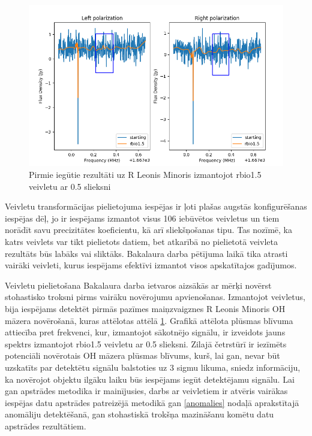 \begin{figure}[h!]

\centering
\includegraphics[width=\textwidth]{images/created/rbio15-rlmi-sdr-boxed.png}
\caption{Pirmie iegūtie rezultāti uz R Leonis Minoris izmantojot rbio1.5 veivletu ar 0.5 slieksni}
\label{fig:rlmi-boxed}
\end{figure}


Veivletu transformācijas pielietojuma iespējas ir ļoti plašas augstās konfigurēšanas iespējas dēļ, jo ir iespējams izmantot visus 106 iebūvētos veivletus un tiem norādīt savu precizitātes koeficientu, kā arī sliekšņošanas tipu. Tas nozīmē, ka katrs veivlets var tikt pielietots datiem, bet atkarībā no pielietotā veivleta rezultāts būs labāks vai sliktāks. Bakalaura darba pētījuma laikā tika atrasti vairāki veivleti, kurus iespējams efektīvi izmantot visos apskatītajos gadījumos.



Veivletu pielietošana Bakalaura darba ietvaros aizsākās ar mērķi novērst stohastisko troksni pirms vairāku novērojumu apvienošanas. Izmantojot veivletus, bija iespējams detektēt pirmās pazīmes maiņzvaigznes R Leonis Minoris OH māzera novērošanā, kuras attēlotas attēlā \ref{fig:rlmi-boxed}. Grafikā attēlota plūsmas blīvuma attiecība pret frekvenci, kur, izmantojot sākotnējo signālu, ir izveidots jauns spektrs izmantojot rbio1.5 veivletu ar 0.5 slieksni. Zilajā četrstūrī ir iezīmēts potenciāli novērotais OH māzera plūsmas blīvums, kurš, lai gan, nevar būt uzskatīts par detektētu signālu balstoties uz 3 sigmu likuma, sniedz informāciju, ka novērojot objektu ilgāku laiku būs iespējams iegūt detektējamu signālu. Lai gan apstrādes metodika ir mainījusies, darbs ar veivletiem ir atvēris vairākas iespējas datu apstrādes patreizējā metodikā gan \ref{anomalies} nodaļā aprakstītajā anomāliju detektēšanā, gan stohastiskā trokšņa mazināšanu komētu datu apstrādes rezultātiem.





